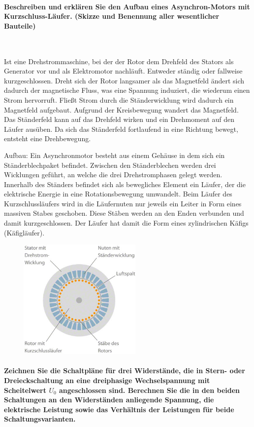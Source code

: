 \documentclass[a4paper, 11pt, ngerman, parskip=half-]{scrartcl}
\begin{document}
\paragraph{Beschreiben und erklären Sie den Aufbau eines Asynchron-Motors mit Kurzschluss-Läufer.
    (Skizze und Benennung aller wesentlicher Bauteile)} ~

Ist eine Drehstrommaschine, bei der der Rotor dem Drehfeld des Stators als Generator vor und als
Elektromotor nachläuft. Entweder ständig oder fallweise kurzgeschlossen. Dreht sich der Rotor
langsamer als das Magnetfeld ändert sich dadurch der magnetische Fluss, was eine Spannung induziert,
die wiederum einen Strom hervorruft. Fließt Strom durch die Ständerwicklung wird dadurch ein
Magnetfeld aufgebaut. Aufgrund der Kreisbewegung wandert das Magnetfeld. Das Ständerfeld kann auf
das Drehfeld wirken und ein Drehmoment auf den Läufer ausüben. Da sich das Ständerfeld fortlaufend
in eine Richtung bewegt, entsteht eine Drehbewegung.

Aufbau: Ein Asynchronmotor besteht aus einem Gehäuse in dem sich ein Ständerblechpaket befindet.
Zwischen den Ständerblechen werden drei Wicklungen geführt, an welche die drei Drehstromphasen
gelegt werden. Innerhalb des Ständers befindet sich als bewegliches Element ein Läufer, der die
elektrische Energie in eine Rotationsbewegung umwandelt. Beim Läufer des Kurzschlussläufers wird in die
Läufernuten nur jeweils ein Leiter in Form eines massiven Stabes geschoben. Diese Stäben werden an
den Enden verbunden und damit kurzgeschlossen. Der Läufer hat damit die Form eines zylindrischen
Käfigs (Käfigläufer).

\begin{figure}[H]
    \centering
    \includegraphics[width=6cm]{image/09/6}
\end{figure}

\paragraph{Zeichnen Sie die Schaltpläne für drei Widerstände, die in Stern- oder Dreieckschaltung an
    eine dreiphasige Wechselspannung mit Scheitelwert $U_0$ angeschlossen sind. Berechnen Sie die in den
    beiden Schaltungen an den Widerständen anliegende Spannung, die elektrische Leistung sowie das
    Verhältnis der Leistungen für beide Schaltungsvarianten.} ~
\end{document}
